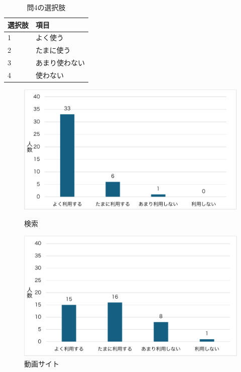 \documentclass[12pt,a4j,titlepage]{ltjsarticle}
\begin{document}
\begin{table}[htbp]
  \caption{問4の選択肢}
  \begin{center}
\begin{tabular}{ll}\hline
選択肢 & 項目\\ \hline
               1 & よく使う \\ 
               2 & たまに使う\\
               3 & あまり使わない\\
               4 & 使わない\\
              \hline
               \end{tabular}
               \end{center}
               \label{tb:anke1_4}
               \end{table}

\clearpage

\begin{figure}[!htb]
\centering
\begin{minipage}[b]{0.49\columnwidth}
    \centering
    \includegraphics[width=1.0\columnwidth]{検索.pdf}
    \caption{検索}
    \label{fig:kensaku}
\end{minipage}
\begin{minipage}[b]{0.49\columnwidth}
    \centering
    \includegraphics[width=1.0\columnwidth]{動画サイト.pdf}
    \caption{動画サイト}
    \label{fig:dougasaito}
\end{minipage}
\end{figure}
\end{document}
